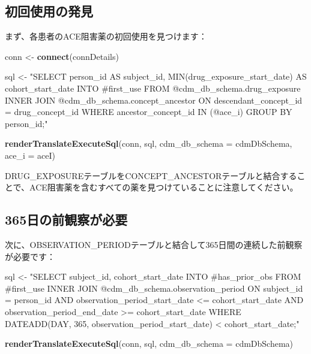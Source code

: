 \documentclass[
  11pt]{book}
\newenvironment{Shaded}{\begin{snugshade}}{\end{snugshade}}
\newcommand{\AttributeTok}[1]{\textcolor[rgb]{0.13,0.29,0.53}{#1}}
\newcommand{\FunctionTok}[1]{\textcolor[rgb]{0.13,0.29,0.53}{\textbf{#1}}}
\newcommand{\NormalTok}[1]{#1}
\newcommand{\OtherTok}[1]{\textcolor[rgb]{0.56,0.35,0.01}{#1}}
\newcommand{\StringTok}[1]{\textcolor[rgb]{0.31,0.60,0.02}{#1}}
\theoremstyle{definition}
\theoremstyle{definition}
\theoremstyle{definition}
\theoremstyle{definition}
\theoremstyle{remark}
\begin{document}
\subsection{初回使用の発見}\label{ux521dux56deux4f7fux7528ux306eux767aux898b}

まず、各患者のACE阻害薬の初回使用を見つけます：

\begin{Shaded}
\begin{Highlighting}[]
\NormalTok{conn }\OtherTok{\textless{}{-}} \FunctionTok{connect}\NormalTok{(connDetails)}

\NormalTok{sql }\OtherTok{\textless{}{-}} \StringTok{"SELECT person\_id AS subject\_id,}
\StringTok{  MIN(drug\_exposure\_start\_date) AS cohort\_start\_date}
\StringTok{INTO \#first\_use}
\StringTok{FROM @cdm\_db\_schema.drug\_exposure}
\StringTok{INNER JOIN @cdm\_db\_schema.concept\_ancestor}
\StringTok{  ON descendant\_concept\_id = drug\_concept\_id}
\StringTok{WHERE ancestor\_concept\_id IN (@ace\_i)}
\StringTok{GROUP BY person\_id;"}

\FunctionTok{renderTranslateExecuteSql}\NormalTok{(conn,}
\NormalTok{                          sql,}
                          \AttributeTok{cdm\_db\_schema =}\NormalTok{ cdmDbSchema,}
                          \AttributeTok{ace\_i =}\NormalTok{ aceI)}
\end{Highlighting}
\end{Shaded}

DRUG\_EXPOSUREテーブルをCONCEPT\_ANCESTORテーブルと結合することで、ACE阻害薬を含むすべての薬を見つけていることに注意してください。

\subsection{365日の前観察が必要}\label{ux65e5ux306eux524dux89b3ux5bdfux304cux5fc5ux8981}

次に、OBSERVATION\_PERIODテーブルと結合して365日間の連続した前観察が必要です：

\begin{Shaded}
\begin{Highlighting}[]
\NormalTok{sql }\OtherTok{\textless{}{-}} \StringTok{"SELECT subject\_id,}
\StringTok{  cohort\_start\_date}
\StringTok{INTO \#has\_prior\_obs}
\StringTok{FROM \#first\_use}
\StringTok{INNER JOIN @cdm\_db\_schema.observation\_period}
\StringTok{  ON subject\_id = person\_id}
\StringTok{    AND observation\_period\_start\_date \textless{}= cohort\_start\_date}
\StringTok{    AND observation\_period\_end\_date \textgreater{}= cohort\_start\_date}
\StringTok{WHERE DATEADD(DAY, 365, observation\_period\_start\_date) \textless{} cohort\_start\_date;"}

\FunctionTok{renderTranslateExecuteSql}\NormalTok{(conn, sql, }\AttributeTok{cdm\_db\_schema =}\NormalTok{ cdmDbSchema)}
\end{Highlighting}
\end{Shaded}
\end{document}
